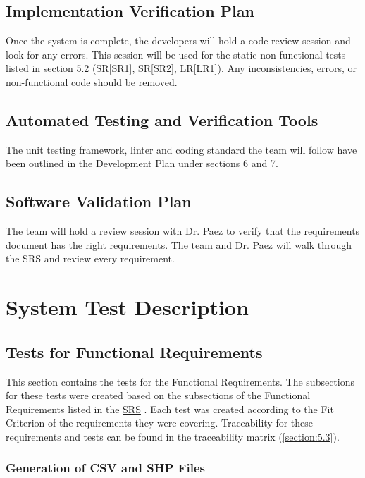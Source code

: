 \documentclass[12pt, titlepage]{article}
\begin{document}
\subsection{Implementation Verification Plan}
\label{section:4.5}
Once the system is complete, the developers will hold a code review session and look for any errors. This session will be used for the static non-functional tests listed in section 5.2 (SR\ref{SR1}, SR\ref{SR2}, LR\ref{LR1}). Any inconsistencies, errors, or non-functional code should be removed.

\subsection{Automated Testing and Verification Tools}
\label{section:4.6}
 The unit testing framework, linter and coding standard the team will follow have been outlined in the \href{https://github.com/paezha/PyERT-BLACK/blob/main/docs/DevelopmentPlan/DevelopmentPlan.pdf}{Development Plan} under sections 6 and 7.

\subsection{Software Validation Plan}
\label{section:4.7}

The team will hold a review session with Dr. Paez to verify that the requirements document has the right requirements. The team and Dr. Paez will walk through the SRS and review every requirement.

\section{System Test Description}
\label{section:5}	
\subsection{Tests for Functional Requirements}

This section contains the tests for the Functional Requirements. The subsections for these tests were created based on the subsections of the Functional Requirements listed in the \href{https://github.com/paezha/PyERT-BLACK/blob/main/docs/SRS/SRS.pdf}{SRS} \citep{SRS}. Each test was created according to the Fit Criterion of the requirements they were covering. Traceability for these requirements and tests can be found in the traceability matrix (\ref{section:5.3}). 


\subsubsection{Generation of CSV and SHP Files}
\end{document}
